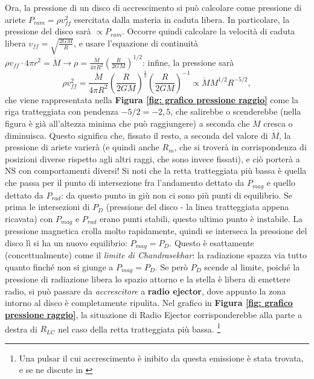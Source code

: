 Ora, la pressione di un disco di accrescimento si può calcolare come pressione di ariete $P_{ram} = \rho v_{ff}^2$ esercitata dalla materia in caduta libera.
In particolare, la pressione del disco sarà $\propto P_{ram}$.
Occorre quindi calcolare la velocità di caduta libera $v_{ff} = \sqrt{\frac{2GM}{R}}$, e usare l'equazione di continuità $\rho v_{ff} \cdot4\pi r^2 = \dot{M} \xrightarrow{} \rho = \frac{\dot{M}}{4\pi R^2} \left(\frac{R}{2GM}\right)^{1/2} $: infine, la pressione sarà
\begin{equation}
    \rho v_{ff}^2 = \frac{\dot{M}}{4\pi R^2}\left( \frac{R}{2GM} \right)^{\frac{1}{2}}\left( \frac{R}{2GM} \right)^{-1} \propto \dot{M}M^{1/2}R^{-5/2},
\end{equation}
che viene rappresentata nella \textbf{Figura \ref{fig: grafico pressione raggio}} come la riga tratteggiata con pendenza $-5/2 = -2,5$, che salirebbe o scenderebbe (nella figura è già all'altezza minima che può raggiungere) a seconda che $\dot{M}$ cresca o diminuisca.
Questo significa che, fissato il resto, a seconda del valore di $\dot{M}$, la pressione di ariete varierà (e quindi anche $R_m$, che si troverà in corrispondenza di posizioni diverse rispetto agli altri raggi, che sono invece fissati), e ciò porterà a NS con comportamenti diversi!
Si noti che la retta tratteggiata più bassa è quella che passa per il punto di intersezione fra l'andamento dettato da $P_{mag}$ e quello dettato da $P_{rad}$: da questo punto in giù non ci sono più punti di equilibrio.
Se prima le intersezioni di $P_D$ (pressione del disco - la linea tratteggiata appena ricavata) con $P_{mag}$ e $P_{rad} $ erano punti stabili, questo ultimo punto è instabile.
La pressione magnetica crolla molto rapidamente, quindi se interseca la pressione del disco lì si ha un nuovo equilibrio: $P_{mag} = P_D$. 
Questo è esattamente (concettualmente) come il \textit{limite di Chandrasekhar}: la radiazione spazza via tutto quanto finché non si giunge a $P_{mag} = P_D$. 
Se però $P_D$ scende al limite, poiché la pressione di radiazione libera lo spazio attorno e la stella è libera di emettere radio, si può passare da \textit{accrescitore} a \textbf{radio ejector}, dove appunto la zona intorno al disco è completamente ripulita.
Nel grafico in \textbf{Figura \ref{fig: grafico pressione raggio}}, la situazione di Radio Ejector corrisponderebbe alla parte a destra di $R_{LC}$ nel caso della retta tratteggiata più bassa.
\footnote{Una pulsar il cui accrescimento è inibito da questa emissione è stata trovata, e se ne discute in \cite{Burderi_2002}}

